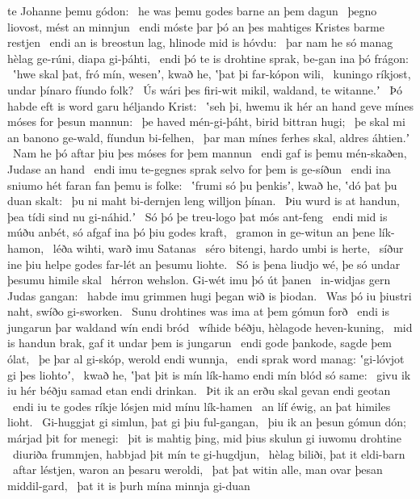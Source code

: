 te Johanne þemu gódon: \hld\ he was þemu godes barne
an þem dagun \hld\ þegno liovost,
mést an minnjun \hld\ endi móste þar þó an þes mahtiges Kristes
barme restjen \hld\ endi an is breostun lag,
hlinode mid is hóvdu: \hld\ þar nam he só manag hèlag ge-rúni,
diapa gi-þáhti, \hld\ endi þó te is drohtine sprak,
be-gan ina þó frágon: \hld\ ʽhwe skal þat, fró mín, wesenʼ, kwað he,
ʽþat þi far-kópon wili, \hld\ kuningo ríkjost,
undar þínaro fíundo folk? \hld\ Ús wári þes firi-wit mikil,
waldand, te witanne.ʼ \hld\ Þó habde eft is word garu
héljando Krist: \hld\ ʽseh þi, hwemu ik hér an hand geve
mínes móses for þesun mannun: \hld\ þe haved mén-gi-þáht,
birid bittran hugi; \hld\ þe skal mi an banono ge-wald,
fíundun bi-felhen, \hld\ þar man mínes ferhes skal,
aldres áhtien.ʼ \hld\ Nam he þó aftar þiu
þes móses for þem mannun \hld\ endi gaf is þemu mén-skaðen,
Judase an hand \hld\ endi imu te-gegnes sprak
selvo for þem is ge-síðun \hld\ endi ina sniumo hét
faran fan þemu is folke: \hld\ ʽfrumi só þu þenkisʼ, kwað he,
ʽdó þat þu duan skalt: \hld\ þu ni maht bi-dernjen leng
willjon þínan. \hld\ Þiu wurd is at handun,
þea tídi sind nu gi-náhid.ʼ \hld\ Só þó þe treu-logo
þat mós ant-feng \hld\ endi mid is múðu anbét,
só afgaf ina þó þiu godes kraft, \hld\ gramon in ge-witun
an þene lík-hamon, \hld\ léða wihti,
warð imu Satanas \hld\ séro bitengi,
hardo umbi is herte, \hld\ síður ine þiu helpe godes
far-lét an þesumu liohte. \hld\ Só is þena liudjo wé,
þe só undar þesumu himile skal \hld\ hérron wehslon.
Gi-wét imu þó út þanen \hld\ in-widjas gern
Judas gangan: \hld\ habde imu grimmen hugi
þegan wið is þiodan. \hld\ Was þó iu þiustri naht,
swíðo gi-sworken. \hld\ Sunu drohtines
was ima at þem gómun forð \hld\ endi is jungarun þar
waldand wín endi bród \hld\ wíhide béðju,
hèlagode heven-kuning, \hld\ mid is handun brak,
gaf it undar þem is jungarun \hld\ endi gode þankode,
sagde þem ólat, \hld\ þe þar al gi-skóp,
werold endi wunnja, \hld\ endi sprak word manag:
ʽgi-lóvjot gi þes liohtoʼ, \hld\ kwað he, ʽþat þit is mín lík-hamo
endi mín blód só same: \hld\ givu ik iu hér béðju samad
etan endi drinkan. \hld\ Þit ik an erðu skal
gevan endi geotan \hld\ endi iu te godes ríkje
lósjen mid mínu lík-hamen \hld\ an líf éwig,
an þat himiles lioht. \hld\ Gi-huggjat gi simlun,
þat gi þiu ful-gangan, \hld\ þiu ik an þesun gómun dón;
márjad þit for menegi: \hld\ þit is mahtig þing,
mid þius skulun gi iuwomu drohtine \hld\ diuriða frummjen,
habbjad þit mín te gi-hugdjun, \hld\ hèlag biliði,
þat it eldi-barn \hld\ aftar léstjen,
waron an þesaru weroldi, \hld\ þat þat witin alle,
man ovar þesan middil-gard, \hld\ þat it is þurh mína minnja gi-duan
